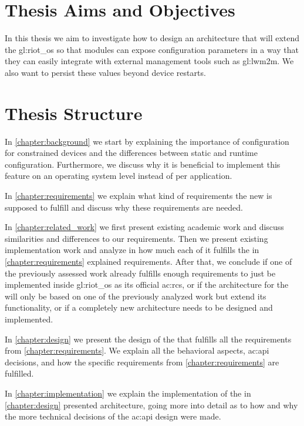 \section{Thesis Aims and Objectives}
\label{sec:introduction:aims_and_objectives}

In this thesis we aim to investigate how to design an architecture that will extend the \gls{gl:riot_os} so that modules can expose configuration parameters in a way that they can easily integrate with external management tools such as \gls{gl:lwm2m}.
We also want to persist these values beyond device restarts.

\section{Thesis Structure}
\label{sec:introduction:structure}

In \autoref{chapter:background} we start by explaining the importance of configuration for constrained devices and the differences between static and runtime configuration.
Furthermore, we discuss why it is beneficial to implement this feature on an operating system level instead of per application.

In \autoref{chapter:requirements} we explain what kind of requirements the new  is supposed to fulfill and discuss why these requirements are needed.

In \autoref{chapter:related_work} we first present existing academic work and discuss similarities and differences to our requirements.
Then we present existing implementation work and analyze in how much each of it fulfills the in \autoref{chapter:requirements} explained requirements.
After that, we conclude if one of the previously assessed work already fulfills enough requirements to just be implemented inside \gls{gl:riot_os} as its official \gls{ac:rcs}, or if the architecture for the  will only be based on one of the previously analyzed work but extend its functionality, or if a completely new architecture needs to be designed and implemented.

In \autoref{chapter:design} we present the design of the  that fulfills all the requirements from \autoref{chapter:requirements}.
We explain all the behavioral aspects, \gls{ac:api} decisions, and how the specific requirements from \autoref{chapter:requirements} are fulfilled.

In \autoref{chapter:implementation} we explain the implementation of the in \autoref{chapter:design} presented architecture, going more into detail as to how and why the more technical decisions of the \gls{ac:api} design were made.


